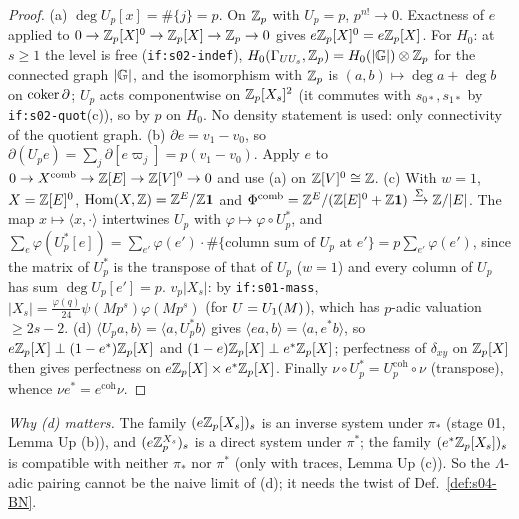 \begin{proof}
(a) $\deg U_p[x]=\#\{j\}=p$. On $\mathbb{Z}_p$ with $U_p=p$, $p^{n!}\to0$. Exactness of $e$ applied to $0\to\mathbb{Z}_p[X]^0\to\mathbb{Z}_p[X]\to\mathbb{Z}_p\to0$
gives $e\mathbb{Z}_p[X]^0=e\mathbb{Z}_p[X]$. For $H_0$: at $s\ge1$ the level is free (\texttt{if:s02-indef}), $H_0(\Gamma_{UU_s},\mathbb{Z}_p)=H_0(|\mathbb{G}|)\otimes\mathbb{Z}_p$
for the connected graph $|\mathbb{G}|$, and the isomorphism with $\mathbb{Z}_p$ is $(a,b)\mapsto\deg a+\deg b$ on $\operatorname{coker}\partial$; $U_p$ acts
componentwise on $\mathbb{Z}_p[X_s]^{2}$ (it commutes with $s_{0*},s_{1*}$ by \texttt{if:s02-quot}(c)), so by $p$ on $H_0$. No density
statement is used: only connectivity of the quotient graph.
(b) $\partial e=v_1-v_0$, so $\partial(U_pe)=\sum_j\partial[e\varpi_j]=p(v_1-v_0)$. Apply $e$ to
$0\to X^{\mathrm{comb}}\to\mathbb{Z}[E]\to\mathbb{Z}[V]^0\to0$ and use (a) on $\mathbb{Z}[V]^0\cong\mathbb{Z}$.
(c) With $w=1$, $X=\mathbb{Z}[E]^0$, $\operatorname{Hom}(X,\mathbb{Z})=\mathbb{Z}^E/\mathbb{Z}\mathbf 1$ and $\Phi^{\mathrm{comb}}=\mathbb{Z}^E/(\mathbb{Z}[E]^0+\mathbb{Z}\mathbf1)\xrightarrow{\Sigma}\mathbb{Z}/|E|$. The map
$x\mapsto\langle x,\cdot\rangle$ intertwines $U_p$ with $\varphi\mapsto\varphi\circ U_p^*$, and
$\sum_e\varphi(U_p^*[e])=\sum_{e'}\varphi(e')\cdot\#\{\text{column sum of }U_p\text{ at }e'\}=p\sum_{e'}\varphi(e')$, since
the matrix of $U_p^*$ is the transpose of that of $U_p$ ($w=1$) and every column of $U_p$ has sum $\deg U_p[e']=p$.
$v_p|X_s|$: by \texttt{if:s01-mass}, $|X_s|=\frac{\varphi(q)}{24}\psi(Mp^s)\varphi(Mp^s)$ (for $U=U_1(M)$), which has $p$-adic
valuation $\ge2s-2$.
(d) $\langle U_pa,b\rangle=\langle a,U_p^*b\rangle$ gives $\langle e a,b\rangle=\langle a,e^*b\rangle$, so
$e\mathbb{Z}_p[X]\perp(1-e^*)\mathbb{Z}_p[X]$ and $(1-e)\mathbb{Z}_p[X]\perp e^*\mathbb{Z}_p[X]$; perfectness of $\delta_{xy}$ on $\mathbb{Z}_p[X]$ then gives perfectness on
$e\mathbb{Z}_p[X]\times e^*\mathbb{Z}_p[X]$. Finally $\nu\circ U_p^*=U_p^{\mathrm{coh}}\circ\nu$ (transpose), whence $\nu e^*=e^{\mathrm{coh}}\nu$.
\end{proof}
\noindent\emph{Why (d) matters.} The family $(e\mathbb{Z}_p[X_s])_s$ is an inverse system under $\pi_*$ (stage 01, Lemma Up (b)), and
$(e\mathbb{Z}_p^{X_s})_s$ is a direct system under $\pi^*$; the family $(e^*\mathbb{Z}_p[X_s])_s$ is compatible with neither $\pi_*$ nor
$\pi^*$ (only with traces, Lemma Up (c)). So the $\Lambda$-adic pairing cannot be the naive limit of (d); it needs the twist of
Def.~\ref{def:s04-BN}.

